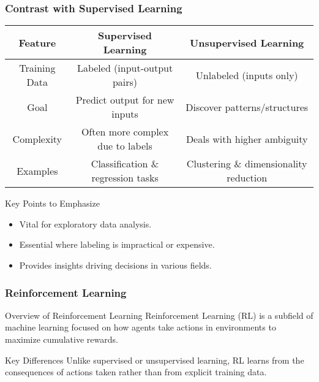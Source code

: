 \documentclass[aspectratio=169]{beamer}
\begin{document}
\begin{frame}[fragile]
    \frametitle{Contrast with Supervised Learning}
    \begin{center}
        \begin{tabular}{|c|c|c|}
            \hline
            \textbf{Feature} & \textbf{Supervised Learning} & \textbf{Unsupervised Learning} \\
            \hline
            Training Data & Labeled (input-output pairs) & Unlabeled (inputs only) \\
            \hline
            Goal & Predict output for new inputs & Discover patterns/structures \\
            \hline
            Complexity & Often more complex due to labels & Deals with higher ambiguity \\
            \hline
            Examples & Classification \& regression tasks & Clustering \& dimensionality reduction \\
            \hline
        \end{tabular}
    \end{center}

    \begin{block}{Key Points to Emphasize}
        \begin{itemize}
            \item Vital for exploratory data analysis.
            \item Essential where labeling is impractical or expensive.
            \item Provides insights driving decisions in various fields.
        \end{itemize}
    \end{block}
\end{frame}

\begin{frame}[fragile]
    \frametitle{Reinforcement Learning}
    \begin{block}{Overview of Reinforcement Learning}
        Reinforcement Learning (RL) is a subfield of machine learning focused on how agents take actions in environments to maximize cumulative rewards.
    \end{block}
    \begin{block}{Key Differences}
        Unlike supervised or unsupervised learning, RL learns from the consequences of actions taken rather than from explicit training data.
    \end{block}
\end{frame}
\end{document}
